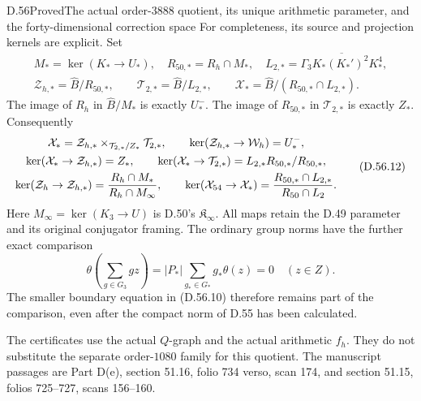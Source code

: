\begin{statement}{D.56}{Proved}{The actual order-\(3888\) quotient, its unique arithmetic parameter, and the forty-dimensional correction space}
For completeness, its source and projection kernels are explicit.
Set
\[
 \begin{gathered}
 M_*=\ker(K_*\to U_*),\quad
 R_{50,*}=R_h\cap M_*,\quad
 L_{2,*}=\overline{\Gamma_3K_*(K_*')^2K_*^4},\\
 \mathcal Z_{h,*}=\widehat B/R_{50,*},\qquad
 \mathcal T_{2,*}=\widehat B/L_{2,*},\qquad
 \mathcal X_*=\widehat B/(R_{50,*}\cap L_{2,*}).
 \end{gathered}
 \tag{D.56.11}
\]
The image of \(R_h\) in \(\widehat B/M_*\) is exactly \(U_*^-\).
The image of \(R_{50,*}\) in \(\mathcal T_{2,*}\) is exactly \(Z_*\).
Consequently
\[
 \begin{gathered}
 \mathcal X_*=
 \mathcal Z_{h,*}\times_{\mathcal T_{2,*}/Z_*}\mathcal T_{2,*},
 \qquad
 \ker(\mathcal Z_{h,*}\to\mathcal W_h)=U_*^-,\\
 \ker(\mathcal X_*\to\mathcal Z_{h,*})=Z_*,
 \qquad
 \ker(\mathcal X_*\to\mathcal T_{2,*})
       =L_{2,*}R_{50,*}/R_{50,*},\\
 \ker(\mathcal Z_h\to\mathcal Z_{h,*})
       ={R_h\cap M_*\over R_h\cap M_\infty},
 \qquad
 \ker(\mathcal X_{54}\to\mathcal X_*)
       ={R_{50,*}\cap L_{2,*}\over R_{50}\cap L_2}.
 \end{gathered}
 \tag{D.56.12}
\]
Here \(M_\infty=\ker(K_3\to U)\) is D.50's
\(\mathfrak K_\infty\). All maps retain the D.49
parameter and its original conjugator framing.
The ordinary group norms have the further exact comparison
\[
 \theta\!\left(\sum_{g\in G_3}gz\right)
   =|P_*|\sum_{g_*\in G_*}g_*\theta(z)=0
       \quad(z\in Z).
 \tag{D.56.13}
\]
The smaller boundary equation in (D.56.10) therefore remains
part of the comparison, even after the compact norm of D.55
has been calculated.

The certificates use the actual \(Q\)-graph and the actual
arithmetic \(f_h\). They do not substitute the separate
order-\(1080\) family for this quotient.
The manuscript passages are Part D(e), section 51.16,
folio 734 verso, scan 174, and section 51.15,
folios 725--727, scans 156--160.
\end{statement}
